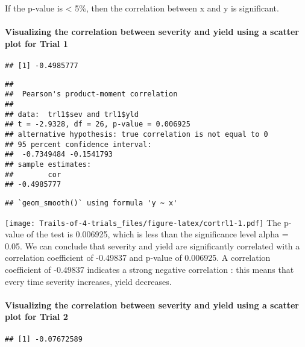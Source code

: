 \documentclass[
]{article}
\begin{document}
If the p-value is \textless{} 5\%, then the correlation between x and y
is significant.

\hypertarget{visualizing-the-correlation-between-severity-and-yield-using-a-scatter-plot-for-trial-1}{%
\paragraph{Visualizing the correlation between severity and yield using
a scatter plot for Trial
1}\label{visualizing-the-correlation-between-severity-and-yield-using-a-scatter-plot-for-trial-1}}

\begin{verbatim}
## [1] -0.4985777
\end{verbatim}

\begin{verbatim}
## 
##  Pearson's product-moment correlation
## 
## data:  trl1$sev and trl1$yld
## t = -2.9328, df = 26, p-value = 0.006925
## alternative hypothesis: true correlation is not equal to 0
## 95 percent confidence interval:
##  -0.7349484 -0.1541793
## sample estimates:
##        cor 
## -0.4985777
\end{verbatim}

\begin{verbatim}
## `geom_smooth()` using formula 'y ~ x'
\end{verbatim}

\texttt{[image: Trails-of-4-trials\_files/figure-latex/cortrl1-1.pdf]}
The p-value of the test is 0.006925, which is less than the significance
level alpha = 0.05. We can conclude that severity and yield are
significantly correlated with a correlation coefficient of -0.49837 and
p-value of 0.006925. A correlation coefficient of -0.49837 indicates a
strong negative correlation : this means that every time severity
increases, yield decreases.

\hypertarget{visualizing-the-correlation-between-severity-and-yield-using-a-scatter-plot-for-trial-2}{%
\paragraph{Visualizing the correlation between severity and yield using
a scatter plot for Trial
2}\label{visualizing-the-correlation-between-severity-and-yield-using-a-scatter-plot-for-trial-2}}

\begin{verbatim}
## [1] -0.07672589
\end{verbatim}
\end{document}
